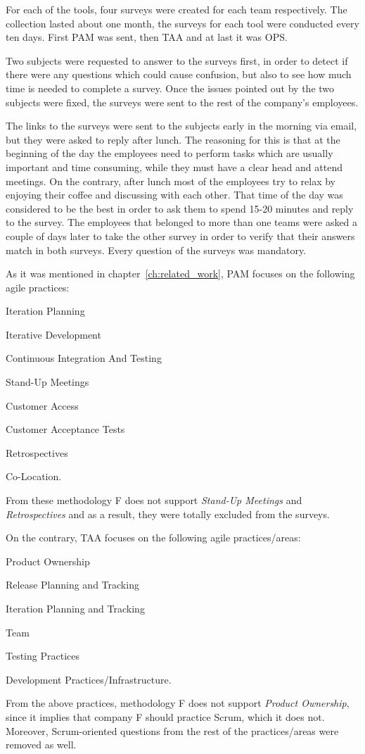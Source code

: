 For each of the tools, four surveys were created for each team respectively. The collection lasted about one month, the surveys for each tool were conducted every ten days. First PAM was sent, then TAA and at last it was OPS.

Two subjects were requested to answer to the surveys first, in order to detect if there were any questions which could cause confusion, but also to see how much time is needed to complete a survey. Once the issues pointed out by the two subjects were fixed, the surveys were sent to the rest of the company's employees.

The links to the surveys were sent to the subjects early in the morning via email, but they were asked to reply after lunch. The reasoning for this is that at the beginning of the day the employees need to perform tasks which are usually important and time consuming, while they must have a clear head and attend meetings. On the contrary, after lunch most of the employees try to relax by enjoying their coffee and discussing with each other. That time of the day was considered to be the best in order to ask them to spend 15-20 minutes and reply to the survey. The employees that belonged to more than one teams were asked a couple of days later to take the other survey in order to verify that their answers match in both surveys. Every question of the surveys was mandatory.

As it was mentioned in chapter~\ref{ch:related_work}, PAM focuses on the following agile practices:
\begin{inparaenum} [a\upshape)]
	\item Iteration Planning
	\item Iterative Development
	\item Continuous Integration And Testing
	\item Stand-Up Meetings
	\item Customer Access
	\item Customer Acceptance Tests
	\item Retrospectives
	\item Co-Location.
\end{inparaenum}
From these methodology F does not support \textit{Stand-Up Meetings} and \textit{Retrospectives} and as a result, they were totally excluded from the surveys.

On the contrary, TAA focuses on the following agile practices/areas:
\begin{inparaenum} [a\upshape)]
	\item Product Ownership
	\item Release Planning and Tracking
	\item Iteration Planning and Tracking
	\item Team
	\item Testing Practices
	\item Development Practices/Infrastructure.
\end{inparaenum}
From the above practices, methodology F does not support \textit{Product Ownership}, since it implies that company F should practice Scrum, which it does not. Moreover, Scrum-oriented questions from the rest of the practices/areas were removed as well. 

